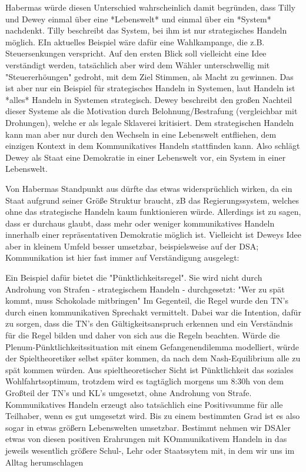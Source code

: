 Habermas würde diesen Unterschied wahrscheinlich damit begründen, dass Tilly und Dewey einmal über eine *Lebenswelt* und einmal über ein *System* nachdenkt.
Tilly beschreibt das System, bei ihm ist nur strategisches Handeln möglich.
EIn aktuelles Beispiel wäre dafür eine Wahlkampange, die z.B. Steuersenkungen verspricht.
Auf den ersten Blick soll vielleicht eine Idee verständigt werden, tatsächlich aber wird dem Wähler unterschwellig mit "Steuererhöungen" gedroht, mit dem Ziel Stimmen, als Macht zu gewinnen.
Das ist aber nur ein Beispiel für strategisches Handeln in Systemen, laut Handeln ist *alles* Handeln in Systemen strategisch.
Dewey beschreibt den großen Nachteil dieser Systeme als die Motivation durch Belohnung/Bestrafung (vergleichbar mit Drohungen), welche er als legale Sklaverei kritisiert.
Dem strategischen Handeln kann man aber nur durch den Wechseln in eine Lebenswelt entfliehen, dem einzigen Kontext in dem Kommunikatives Handeln stattfinden kann.
Also schlägt Dewey als Staat eine Demokratie in einer Lebenswelt vor, ein System in einer Lebenswelt.

Von Habermas Standpunkt aus dürfte das etwas widersprüchlich wirken, da ein Staat aufgrund seiner Größe Struktur braucht, zB das Regierungssystem, welches ohne das strategische Handeln kaum funktionieren würde.
Allerdings ist zu sagen, dass er durchaus glaubt, dass mehr oder weniger kommunikatives Handeln innerhalb einer repräsentativen Demokratie möglich ist.
Vielleicht ist Deweys Idee aber in kleinem Umfeld besser umsetzbar, beispielsweise auf der DSA; Kommunikation ist hier fast immer auf Verständigung ausgelegt:

Ein Beispiel dafür bietet die "Pünktlichkeitsregel".
Sie wird nicht durch Androhung von Strafen - strategischem Handeln - durchgesetzt: "Wer zu spät kommt, muss Schokolade mitbringen"
Im Gegenteil, die Regel wurde den TN's durch einen kommunikativen Sprechakt vermittelt.
Dabei war die Intention, dafür zu sorgen, dass die TN's den Gültigkeitsanspruch erkennen und ein Verständnis für die Regel bilden und daher von sich aus die Regeln beachten.
Würde die Plenum-Pünktlichkeitssituation mit einem Gefangenendilemma modelliert, würde der Spieltheoretiker selbst später kommen, da nach dem Nash-Equilibrium alle zu spät kommen würden.
Aus spieltheoretischer Sicht ist Pünktlichkeit das soziales Wohlfahrtsoptimum, trotzdem wird es tagtäglich morgens um 8:30h von dem Großteil der TN's und KL's umgesetzt, ohne Androhung von Strafe.
Kommunikatives Handeln erzeugt also tatsächlich eine Positivsumme für alle Teilhaber, wenn es gut umgesetzt wird.
Bis zu einem bestimmten Grad ist es also sogar in etwas größern Lebenswelten umsetzbar.
Bestimmt nehmen wir DSAler etwas von diesen positiven Erahrungen mit KOmmunikativem Handeln in das jeweils wesentlich größere Schul-, Lehr oder Staatssytem mit, in dem wir uns im Alltag herumschlagen
